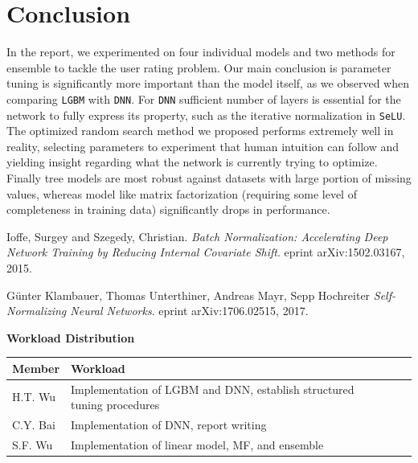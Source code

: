 \documentclass{article}
\begin{document}
\section{Conclusion}
In the report, we experimented on four individual models and two methods for ensemble to tackle the user rating problem. Our main conclusion is parameter tuning is significantly more important than the model itself, as we observed when comparing \texttt{LGBM} with \texttt{DNN}. For \texttt{DNN} sufficient number of layers is essential for the network to fully express its property, such as the iterative normalization in \texttt{SeLU}. The optimized random search method we proposed performs extremely well in reality, selecting parameters to experiment that human intuition can follow and yielding insight regarding what the network is currently trying to optimize. Finally tree models are most robust against datasets with large portion of missing values, whereas model like matrix factorization (requiring some level of completeness in training data) significantly drops in performance.

\begin{thebibliography}{9}
Ioffe, Surgey and Szegedy, Christian. 
\textit{Batch Normalization: Accelerating Deep Network Training by Reducing Internal Covariate Shift}. 
eprint arXiv:1502.03167, 2015.
 
Günter Klambauer, Thomas Unterthiner, Andreas Mayr, Sepp Hochreiter
\textit{Self-Normalizing Neural Networks}.
eprint arXiv:1706.02515, 2017.

\end{thebibliography}
\textbf{Workload Distribution}
\begin{table}[ht]
\begin{tabular}{lllll}
	\toprule
    Member & Workload \\
    \midrule
    H.T. Wu & Implementation of LGBM and DNN, establish structured tuning procedures\\
	C.Y. Bai & Implementation of DNN, report writing\\
    S.F. Wu & Implementation of linear model, MF, and ensemble\\
	\bottomrule
\end{tabular}
\end{table}
\end{document}

